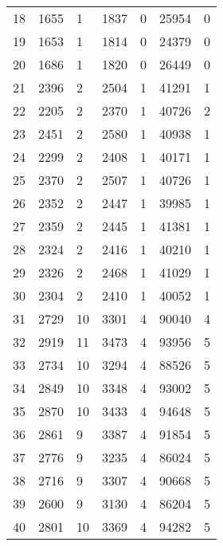 \documentclass[paper=a4, fontsize=11pt]{scrartcl}
\numberwithin{equation}{section}
\numberwithin{figure}{section}
\numberwithin{table}{section}
\begin{document}
{{\begin{tabular}{l || l | l | l | l | l | l }
    18  &  1655   &  1       & 1837   &   0      & 25954     & 0       \\
    19  &  1653   &  1       & 1814   &   0      & 24379     & 0       \\
    20  &  1686   &  1       & 1820   &   0      & 26449     & 0       \\
    21  &  2396   &  2       & 2504   &   1      & 41291     & 1       \\
    22  &  2205   &  2       & 2370   &   1      & 40726     & 2       \\
    23  &  2451   &  2       & 2580   &   1      & 40938     & 1       \\
    24  &  2299   &  2       & 2408   &   1      & 40171     & 1       \\
    25  &  2370   &  2       & 2507   &   1      & 40726     & 1       \\
    26  &  2352   &  2       & 2447   &   1      & 39985     & 1       \\
    27  &  2359   &  2       & 2445   &   1      & 41381     & 1       \\
    28  &  2324   &  2       & 2416   &   1      & 40210     & 1       \\
    29  &  2326   &  2       & 2468   &   1      & 41029     & 1       \\
    30  &  2304   &  2       & 2410   &   1      & 40052     & 1       \\
    31  &  2729   &  10      & 3301   &   4      & 90040     & 4       \\
    32  &  2919   &  11      & 3473   &   4      & 93956     & 5       \\
    33  &  2734   &  10      & 3294   &   4      & 88526     & 5       \\
    34  &  2849   &  10      & 3348   &   4      & 93002     & 5       \\
    35  &  2870   &  10      & 3433   &   4      & 94648     & 5       \\
    36  &  2861   &  9       & 3387   &   4      & 91854     & 5       \\
    37  &  2776   &  9       & 3235   &   4      & 86024     & 5       \\
    38  &  2716   &  9       & 3307   &   4      & 90668     & 5       \\
    39  &  2600   &  9       & 3130   &   4      & 86204     & 5       \\
    40  &  2801   &  10      & 3369   &   4      & 94282     & 5       \\

\end{tabular}}}
\end{document}
